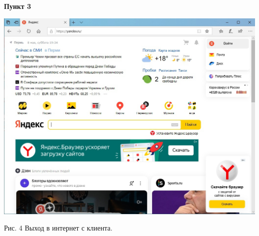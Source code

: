 \documentclass[a4paper,14pt]{extarticle}
\begin{document}
    \textbf{Пункт 3}
    \vspace{-3ex}
    \begin{center}
        \singlespacing

        \includegraphics[scale=0.35]{pics/3.jpg}

        Рис. 4 Выход в интернет с клиента.
    \end{center}
\end{document}
